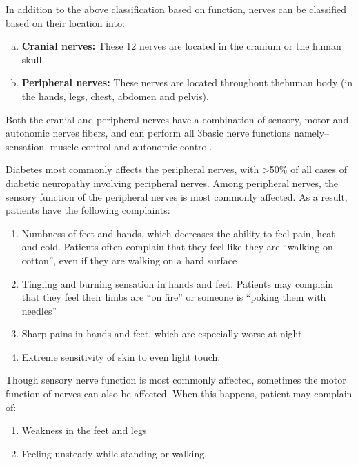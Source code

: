 \noindent In addition to the above classification based on function, nerves can be classified based on their location into:

\begin{enumerate}[a)]
\itemsep=0pt
\item \textbf{Cranial nerves:} These 12 nerves are located in the cranium or the human skull.
\item \textbf{Peripheral nerves:} These nerves are located throughout the\break human body (in the hands, legs, chest, abdomen and pelvis).
\end{enumerate}

Both the cranial and peripheral nerves have a combination of sensory, motor and autonomic nerves fibers, and can perform all 3\break basic nerve functions namely– sensation, muscle control and autono\-mic control.

Diabetes most commonly affects the peripheral nerves, with \textgreater  50\% of all cases of diabetic neuropathy involving peripheral nerves. Among peripheral nerves, the sensory function of the peripheral nerves is most commonly affected. As a result, patients have the following complaints:

\begin{enumerate}[•]
\itemsep=0pt
\item Numbness of feet and hands, which decreases the ability to feel pain, heat and cold. Patients often complain that they feel like they are “walking on cotton”, even if they are walking on a hard surface
\item Tingling and burning sensation in hands and feet. Patients may complain that they feel their limbs are “on fire” or someone is “poking them with needles”
\item Sharp pains in hands and feet, which are especially worse at night
\item Extreme sensitivity of skin to even light touch.
\end{enumerate}

\noindent Though sensory nerve function is most commonly affected, sometimes the motor function of nerves can also be affected. When this happens, patient may complain of:

\begin{enumerate}[•]
\itemsep=0pt
\item Weakness in the feet and legs
\item Feeling unsteady while standing or walking.
\end{enumerate}

